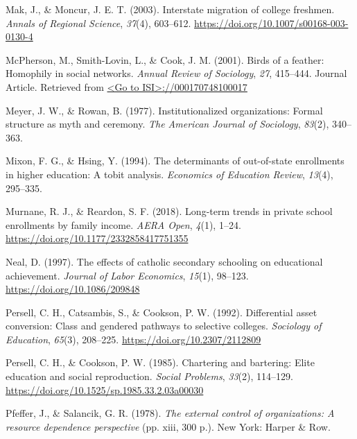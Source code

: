 \documentclass[
  12pt,
]{article}
\newlength{\cslhangindent}
\newlength{\cslentryspacingunit} %
\newenvironment{CSLReferences}[2] %
 {%
  \setlength{\parindent}{0pt}
  \ifodd #1
  \let\oldpar\par
  \def\par{\hangindent=\cslhangindent\oldpar}
  \fi
  \setlength{\parskip}{#2\cslentryspacingunit}
 }%
 {}
\begin{document}
\begin{CSLReferences}{1}{0}
\leavevmode{}%
Mak, J., \& Moncur, J. E. T. (2003). Interstate migration of college freshmen. \emph{Annals of Regional Science}, \emph{37}(4), 603--612. \url{https://doi.org/10.1007/s00168-003-0130-4}

\leavevmode{}%
McPherson, M., Smith-Lovin, L., \& Cook, J. M. (2001). Birds of a feather: Homophily in social networks. \emph{Annual Review of Sociology}, \emph{27}, 415--444. Journal Article. Retrieved from \href{\%3CGo\%20to\%20ISI\%3E://000170748100017}{\textless Go to ISI\textgreater://000170748100017}

\leavevmode{}%
Meyer, J. W., \& Rowan, B. (1977). Institutionalized organizations: Formal structure as myth and ceremony. \emph{The American Journal of Sociology}, \emph{83}(2), 340--363.

\leavevmode{}%
Mixon, F. G., \& Hsing, Y. (1994). The determinants of out-of-state enrollments in higher education: A tobit analysis. \emph{Economics of Education Review}, \emph{13}(4), 295--335.

\leavevmode{}%
Murnane, R. J., \& Reardon, S. F. (2018). Long-term trends in private school enrollments by family income. \emph{AERA Open}, \emph{4}(1), 1--24. \url{https://doi.org/10.1177/2332858417751355}

\leavevmode{}%
Neal, D. (1997). The effects of catholic secondary schooling on educational achievement. \emph{Journal of Labor Economics}, \emph{15}(1), 98--123. \url{https://doi.org/10.1086/209848}

\leavevmode{}%
Persell, C. H., Catsambis, S., \& Cookson, P. W. (1992). Differential asset conversion: Class and gendered pathways to selective colleges. \emph{Sociology of Education}, \emph{65}(3), 208--225. \url{https://doi.org/10.2307/2112809}

\leavevmode{}%
Persell, C. H., \& Cookson, P. W. (1985). Chartering and bartering: Elite education and social reproduction. \emph{Social Problems}, \emph{33}(2), 114--129. \url{https://doi.org/10.1525/sp.1985.33.2.03a00030}

\leavevmode{}%
Pfeffer, J., \& Salancik, G. R. (1978). \emph{The external control of organizations: A resource dependence perspective} (pp. xiii, 300 p.). New York: Harper \& Row.


\end{CSLReferences}
\end{document}

